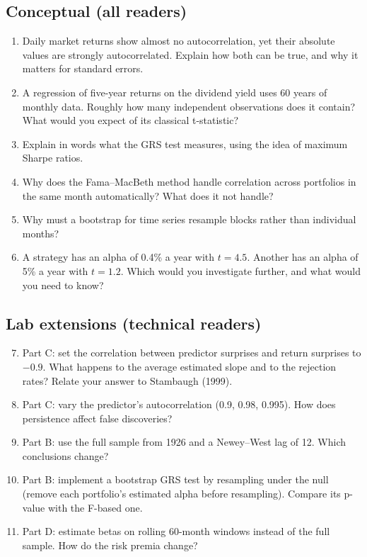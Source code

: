 \subsection*{Conceptual (all readers)}

\begin{enumerate}
  \item Daily market returns show almost no autocorrelation, yet their absolute values are strongly autocorrelated. Explain how both can be true, and why it matters for standard errors.
  \item A regression of five-year returns on the dividend yield uses 60 years of monthly data. Roughly how many independent observations does it contain? What would you expect of its classical t-statistic?
  \item Explain in words what the GRS test measures, using the idea of maximum Sharpe ratios.
  \item Why does the Fama--MacBeth method handle correlation across portfolios in the same month automatically? What does it not handle?
  \item Why must a bootstrap for time series resample blocks rather than individual months?
  \item A strategy has an alpha of 0.4\% a year with $t = 4.5$. Another has an alpha of 5\% a year with $t = 1.2$. Which would you investigate further, and what would you need to know?
\end{enumerate}

\subsection*{Lab extensions (technical readers)}

\begin{enumerate}
  \setcounter{enumi}{6}
  \item Part C: set the correlation between predictor surprises and return surprises to $-0.9$. What happens to the average estimated slope and to the rejection rates? Relate your answer to Stambaugh (1999).
  \item Part C: vary the predictor's autocorrelation (0.9, 0.98, 0.995). How does persistence affect false discoveries?
  \item Part B: use the full sample from 1926 and a Newey--West lag of 12. Which conclusions change?
  \item Part B: implement a bootstrap GRS test by resampling under the null (remove each portfolio's estimated alpha before resampling). Compare its p-value with the F-based one.
  \item Part D: estimate betas on rolling 60-month windows instead of the full sample. How do the risk premia change?
\end{enumerate}

